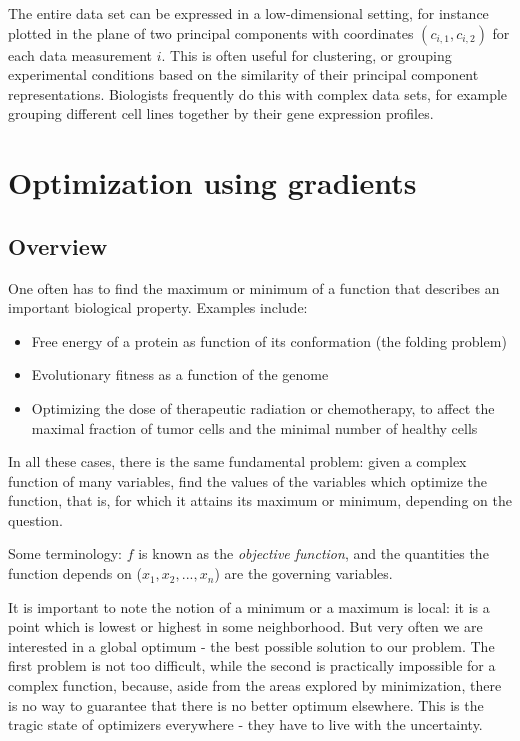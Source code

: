 \documentclass[
  letterpaper,
  DIV=11,
  numbers=noendperiod]{scrreprt}
\begin{document}
The entire data set can be expressed in a low-dimensional setting, for
instance plotted in the plane of two principal components with
coordinates \((c_{i,1}, c_{i,2})\) for each data measurement \(i\). This
is often useful for clustering, or grouping experimental conditions
based on the similarity of their principal component representations.
Biologists frequently do this with complex data sets, for example
grouping different cell lines together by their gene expression
profiles.


\chapter{Optimization using
gradients}\label{optimization-using-gradients}

\section{Overview}\label{overview}

One often has to find the maximum or minimum of a function that
describes an important biological property. Examples include:

\begin{itemize}
\item
  Free energy of a protein as function of its conformation (the folding
  problem)
\item
  Evolutionary fitness as a function of the genome
\item
  Optimizing the dose of therapeutic radiation or chemotherapy, to
  affect the maximal fraction of tumor cells and the minimal number of
  healthy cells
\end{itemize}

In all these cases, there is the same fundamental problem: given a
complex function of many variables, find the values of the variables
which optimize the function, that is, for which it attains its maximum
or minimum, depending on the question.

Some terminology: \(f\) is known as the \emph{objective function}, and
the quantities the function depends on (\(x_1, x_2, ..., x_n\)) are the
governing variables.

It is important to note the notion of a minimum or a maximum is local:
it is a point which is lowest or highest in some neighborhood. But very
often we are interested in a global optimum - the best possible solution
to our problem. The first problem is not too difficult, while the second
is practically impossible for a complex function, because, aside from
the areas explored by minimization, there is no way to guarantee that
there is no better optimum elsewhere. This is the tragic state of
optimizers everywhere - they have to live with the uncertainty.
\end{document}
